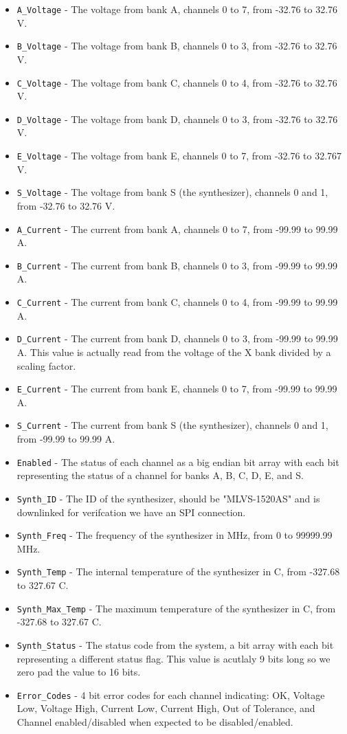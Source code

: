 \begin{itemize}
    \item \texttt{A\_Voltage} - The voltage from bank A, channels 0 to 7, from -32.76 to 32.76 V.
    \item \texttt{B\_Voltage} - The voltage from bank B, channels 0 to 3, from -32.76 to 32.76 V.
    \item \texttt{C\_Voltage} - The voltage from bank C, channels 0 to 4, from -32.76 to 32.76 V.
    \item \texttt{D\_Voltage} - The voltage from bank D, channels 0 to 3, from -32.76 to 32.76 V.
    \item \texttt{E\_Voltage} - The voltage from bank E, channels 0 to 7, from -32.76 to 32.767 V.
    \item \texttt{S\_Voltage} - The voltage from bank S (the synthesizer), channels 0 and 1, from -32.76 to 32.76 V.
    \item \texttt{A\_Current} - The current from bank A, channels 0 to 7, from -99.99 to 99.99 A.
    \item \texttt{B\_Current} - The current from bank B, channels 0 to 3, from -99.99 to 99.99 A.
    \item \texttt{C\_Current} - The current from bank C, channels 0 to 4, from -99.99 to 99.99 A.
    \item \texttt{D\_Current} - The current from bank D, channels 0 to 3, from -99.99 to 99.99 A. This value is actually read from the voltage of the X bank divided by a scaling factor. 
    \item \texttt{E\_Current} - The current from bank E, channels 0 to 7, from -99.99 to 99.99 A.
    \item \texttt{S\_Current} - The current from bank S (the synthesizer), channels 0 and 1, from -99.99 to 99.99 A.
    \item \texttt{Enabled} - The status of each channel as a big endian bit array with each bit representing the status of a channel for banks A, B, C, D, E, and S.
    \item \texttt{Synth\_ID} - The ID of the synthesizer, should be "MLVS-1520AS" and is downlinked for verifcation we have an SPI connection.
    \item \texttt{Synth\_Freq} - The frequency of the synthesizer in MHz, from 0 to 99999.99 MHz.
    \item \texttt{Synth\_Temp} - The internal temperature of the synthesizer in C, from -327.68 to 327.67 C.
    \item \texttt{Synth\_Max\_Temp} - The maximum temperature of the synthesizer in C, from -327.68 to 327.67 C.
    \item \texttt{Synth\_Status} - The status code from the system, a bit array with each bit representing a different status flag. This value is acutlaly 9 bits long so we zero pad the value to 16 bits.
    \item \texttt{Error\_Codes} - 4 bit error codes for each channel indicating: OK, Voltage Low, Voltage High, Current Low, Current High, Out of Tolerance, and Channel enabled/disabled when expected to be disabled/enabled.
\end{itemize}
